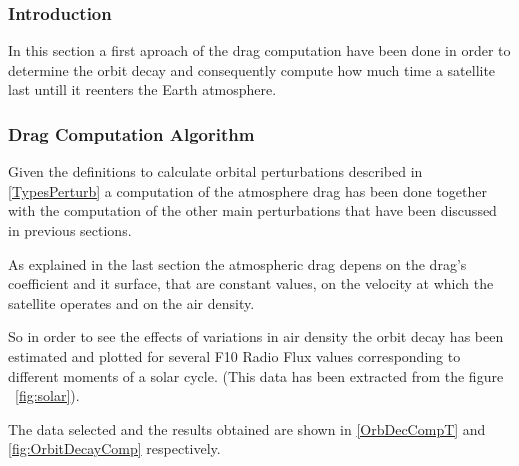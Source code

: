 \subsubsection{Introduction}

In this section a first aproach of the drag computation have been done in order to determine the orbit decay and consequently compute how much time a satellite last untill it reenters the Earth atmosphere.

\subsubsection{Drag Computation Algorithm}

Given the definitions to calculate orbital perturbations described in \ref{TypesPerturb} a computation of the atmosphere drag has been done together with the computation of the other main perturbations that have been discussed in previous sections.

As explained in the last section the atmospheric drag depens on the drag's coefficient and it surface, that are constant values, on the velocity at which the satellite operates and on the air density.

So in order to see the effects of variations in air density the orbit decay has been estimated and plotted for several F10 Radio Flux values corresponding to different moments of a solar cycle. (This data has been extracted from the figure ~\ref{fig:solar}).

The data selected and the results obtained are shown in \ref{OrbDecCompT} and \ref{fig:OrbitDecayComp} respectively.


